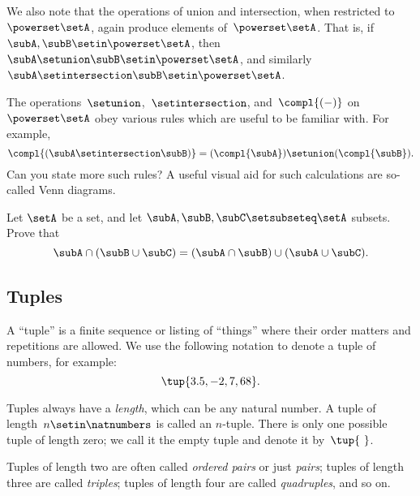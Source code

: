 We also note that the operations of union and intersection, when restricted to~$\powerset \setA$, again produce elements of~$\powerset \setA$.
That is, if~$\subA, \subB \setin\powerset \setA$, then~$\subA \setunion \subB \setin\powerset \setA$, and similarly~$\subA \setintersection \subB \setin\powerset \setA$.

The operations~$\setunion$,~$\setintersection$, and~$\compl{( - )}$ on~$\powerset \setA$ obey various rules which are useful to be familiar with.
For example,
\begin{equation}
    \compl{(\subA \setintersection \subB)} = (\compl{\subA}) \setunion (\compl{\subB}).
\end{equation}
Can you state more such rules?
A useful visual aid for such calculations are so-called Venn diagrams.


\begin{gradedexercise}
    \label{ex:distributing-subsets}
    Let $\setA$ be a set, and let $\subA, \subB, \subC \setsubseteq \setA$ subsets.
    Prove that
    \begin{equation}
        \subA \cap (\subB \cup \subC) = (\subA \cap \subB) \cup (\subA \cup \subC).
    \end{equation}
\end{gradedexercise}


\subsection{Tuples}
\label{sec:tuples}

A ``tuple'' is a finite sequence or listing of ``things'' where their order matters and repetitions are allowed.
We use the following notation to denote a tuple of numbers, for example:
\begin{equation}
    \tup{3.5, -2, 7, 68}.
\end{equation}

Tuples always have a \emph{length}, which can be any natural number.
A tuple of length~$n \setin \natnumbers$ is called an $n$-tuple.
There is only one possible tuple of length zero; we call it the empty tuple and denote it by~$\tup{ \ }$.

Tuples of length two are often called \emph{ordered pairs} or just \emph{pairs};
tuples of length three are called \emph{triples};
tuples of length four are called \emph{quadruples}, and so on.

